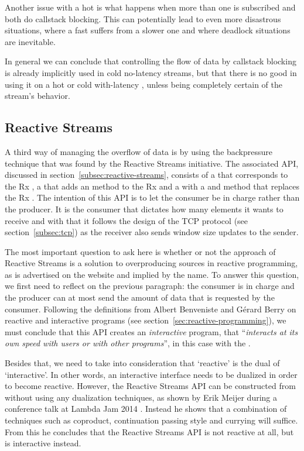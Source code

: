 Another issue with a hot \obs is what happens when more than one \obv is subscribed and both do callstack blocking. This can potentially lead to even more disastrous situations, where a fast \obv suffers from a slower one and where deadlock situations are inevitable.

In general we can conclude that controlling the flow of data by callstack blocking is already implicitly used in cold no-latency streams, but that there is no good in using it on a hot or cold with-latency \obs, unless being completely certain of the stream's behavior.

\subsection{Reactive Streams}
A third way of managing the overflow of data is by using the backpressure technique that was found by the Reactive Streams initiative. The associated API, discussed in section~\ref{subsec:reactive-streams}, consists of a  that corresponds to the Rx \obs, a  that adds an  method to the Rx \obv and a  with a  and  method that replaces the Rx \subs. The intention of this API is to let the consumer be in charge rather than the producer. It is the consumer that dictates how many elements it wants to receive and with that it follows the design of the TCP protocol (see section~\ref{subsec:tcp}) as the receiver also sends window size updates to the sender.

The most important question to ask here is whether or not the approach of Reactive Streams is a solution to overproducing sources in reactive programming, as is advertised on the website \cite{Reactive-Streams} and implied by the name. To answer this question, we first need to reflect on the previous paragraph: the consumer is in charge and the producer can at most send the amount of data that is requested by the consumer. Following the definitions from Albert Benveniste and G\'erard Berry \cite{berry1991-Reactive} on reactive and interactive programs (see section~\ref{sec:reactive-programming}), we must conclude that this API creates an \emph{interactive} program, that ``\textit{interacts at its own speed with users or with other programs}'', in this case with the .

Besides that, we need to take into consideration that `reactive' is the dual of `interactive'. In other words, an interactive interface needs to be dualized in order to become reactive. However, the Reactive Streams API can be constructed from \ieb without using any dualization techniques, as shown by Erik Meijer during a conference talk at Lambda Jam 2014 \cite{meijer2014-Derivation}. Instead he shows that a combination of techniques such as coproduct, continuation passing style and currying will suffice. From this he concludes that the Reactive Streams API is not reactive at all, but is interactive instead.

